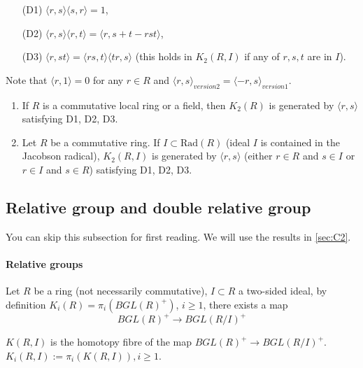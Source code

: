 \begin{itemize}
	\item[(D1)] $\langle r,s\rangle \langle s,r \rangle=1$,\\
	\item[(D2)] $\langle r,s\rangle \langle r,t \rangle=\langle r,s+t-rst \rangle$, \\
	\item[(D3)] $\langle r,st\rangle =\langle rs,t\rangle \langle tr,s\rangle$ (this holds in $K_2(R,I)$ if any of $r,s,t$ are in $I$).
\end{itemize}

Note that $\langle r,1\rangle=0$ for any $r\in R$ and $\langle r,s \rangle_{version 2}=\langle -r,s \rangle_{version 1}$.
\begin{theorem}
	\begin{enumerate}
		\item If $R$ is a {\color{green} commutative local ring or a field}, then $K_2(R)$ is generated by $\langle r,s \rangle$ satisfying D1, D2, D3. \\
		\item Let $R$ be a commutative ring. If $I \subset \mathrm{Rad}(R)$ (ideal $I$ is contained in the Jacobson radical), $K_2(R,I)$ is generated by $\langle r,s \rangle$ (either $r\in R$ and $s\in I$ or $r\in I$ and $s\in R$) satisfying D1, D2, D3.
	\end{enumerate}
	
\end{theorem}



















\subsection{Relative group and double relative group} %
\label{sub:relative_group}
You can skip this subsection for first reading. We will use the results in \ref{sec:C2}.

\paragraph{Relative groups} %
\label{par:relative_groups}
Let $R$ be a ring (not necessarily commutative), $I\subset R$ a two-sided ideal, by definition $K_i(R)=\pi_i(BGL(R)^+)$, $i\geq 1$, there exists a map
\[BGL(R)^+ \longrightarrow BGL(R/I)^+\]
\begin{definition}
	$K(R,I)$ is the homotopy fibre of the map $BGL(R)^+ \longrightarrow BGL(R/I)^+$. $K_i(R,I):=\pi_i(K(R,I)), i\geq 1$.
\end{definition}

